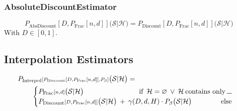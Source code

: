 \documentclass[11pt,a4paper]{article}
\newcommand{\Seq}{\mathcal{S}}
\newcommand{\Hist}{\mathcal{H}}
\newcommand{\Skp}{\rule{7pt}{.5pt}}
\begin{document}
  \subsubsection{AbsoluteDiscountEstimator}

  \begin{equation}
    P_\mathrm{AbsDiscount}{\scriptstyle[D,P_\mathrm{Frac}[n,d]]}\big(\Seq | \Hist\big) = P_\mathrm{Discount}{\scriptstyle[D,P_\mathrm{Frac}[n,d]]}\big(\Seq | \Hist\big)
  \end{equation}
  With $D \in [0,1]$.

  \subsection{Interpolation Estimators}

  \begin{alignat}{2}
    &P_\mathrm{Interpol}{\scriptstyle[P_\mathrm{Discount}[D,P_\mathrm{Frac}[n,d]],P_\beta]}\big(\Seq | \Hist\big) = \\
    &\qquad\begin{cases}
      P_\mathrm{Frac}{\scriptstyle[n,d]}\big(\Seq | \Hist\big) \hspace{80pt} \text{if} \enspace \Hist = \varnothing \: \lor \: \Hist \:\text{contains only} \: \Skp\\
      P_\mathrm{Discount}{\scriptstyle[D,P_\mathrm{Frac}[n,d]]}\big(\Seq | \Hist\big) \: + \: \gamma(D,d,H) \cdot P_\beta\big(\Seq | \Hist\big) \hfill \text{else}
    \end{cases} \notag
  \end{alignat}
\end{document}
